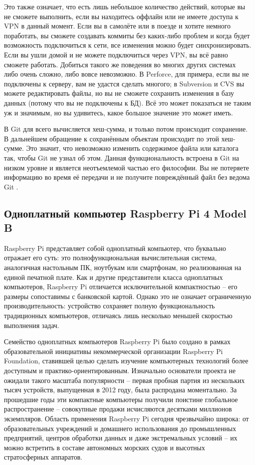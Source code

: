 Это также означает, что есть лишь небольшое количество действий, которые вы не сможете выполнить, если вы находитесь оффлайн или не имеете доступа к VPN в данный момент. Если вы в самолёте или в поезде и хотите немного поработать, вы сможете создавать коммиты без каких-либо проблем и когда будет возможность подключиться к сети, все изменения можно будет синхронизировать. Если вы ушли домой и не можете подключиться через VPN, вы всё равно сможете работать.
Добиться такого же поведения во многих других системах либо очень сложно, либо вовсе невозможно. В Perforce, для примера, если вы не подключены к серверу, вам не удастся сделать многого; в Subversion и CVS вы можете редактировать файлы, но вы не сможете сохранить изменения в базу данных (потому что вы не подключены к БД). Всё это может показаться не таким уж и значимым, но вы удивитесь, какое большое значение это может
иметь.

В Git для всего вычисляется хеш-сумма, и только потом происходит сохранение. В
дальнейшем обращение к сохранённым объектам происходит по этой хеш-сумме. Это
значит, что невозможно изменить содержимое файла или каталога так, чтобы Git не узнал об этом. Данная функциональность встроена в Git на низком уровне и является неотъемлемой частью его философии. Вы не потеряете информацию во время её передачи и не получите повреждённый файл без ведома Git \cite{ProGit}.

\subsection{Одноплатный компьютер Raspberry Pi 4 Model B}

Raspberry Pi представляет собой одноплатный компьютер, что буквально отражает его суть: это полнофункциональная вычислительная система, аналогичная настольным ПК, ноутбукам или смартфонам, но реализованная на единой печатной плате. Как и другие представители класса одноплатных компьютеров, Raspberry Pi отличается исключительной компактностью – его размеры сопоставимы с банковской картой. Однако это не означает ограниченную производительность: устройство сохраняет полную функциональность традиционных компьютеров, отличаясь лишь несколько меньшей скоростью выполнения задач.

Семейство одноплатных компьютеров Raspberry Pi было создано в рамках образовательной инициативы некоммерческой организации Raspberry Pi Foundation, ставившей целью сделать изучение компьютерных технологий более доступным и практико-ориентированным. Изначально основатели проекта не ожидали такого масштаба популярности – первая пробная партия из нескольких тысяч устройств, выпущенная в 2012 году, была распродана моментально. За прошедшие годы эти компактные компьютеры получили поистине глобальное распространение – совокупные продажи исчисляются десятками миллионов экземпляров. Область применения Raspberry Pi сегодня чрезвычайно широка: от образовательных учреждений и домашнего использования до промышленных предприятий, центров обработки данных и даже экстремальных условий – их можно встретить в составе автономных морских судов и высотных стратосферных аппаратов.

